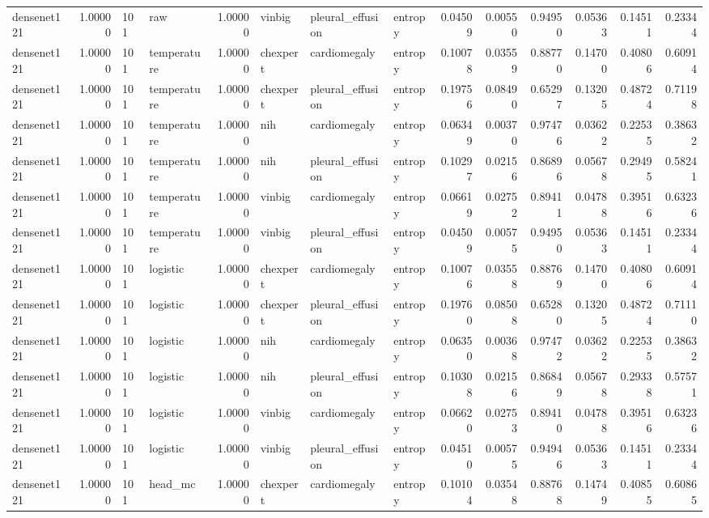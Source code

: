 \begin{tabular}{lrllrlllrrrrrr}
densenet121 & 1.00000 & 101 & raw & 1.00000 & vinbig & pleural\_effusion & entropy & 0.04509 & 0.00550 & 0.94950 & 0.05363 & 0.14511 & 0.23344 \\
densenet121 & 1.00000 & 101 & temperature & 1.00000 & chexpert & cardiomegaly & entropy & 0.10078 & 0.03559 & 0.88770 & 0.14700 & 0.40806 & 0.60914 \\
densenet121 & 1.00000 & 101 & temperature & 1.00000 & chexpert & pleural\_effusion & entropy & 0.19756 & 0.08490 & 0.65297 & 0.13205 & 0.48724 & 0.71198 \\
densenet121 & 1.00000 & 101 & temperature & 1.00000 & nih & cardiomegaly & entropy & 0.06349 & 0.00370 & 0.97476 & 0.03622 & 0.22535 & 0.38632 \\
densenet121 & 1.00000 & 101 & temperature & 1.00000 & nih & pleural\_effusion & entropy & 0.10297 & 0.02156 & 0.86896 & 0.05678 & 0.29495 & 0.58241 \\
densenet121 & 1.00000 & 101 & temperature & 1.00000 & vinbig & cardiomegaly & entropy & 0.06619 & 0.02752 & 0.89411 & 0.04788 & 0.39516 & 0.63236 \\
densenet121 & 1.00000 & 101 & temperature & 1.00000 & vinbig & pleural\_effusion & entropy & 0.04509 & 0.00575 & 0.94950 & 0.05363 & 0.14511 & 0.23344 \\
densenet121 & 1.00000 & 101 & logistic & 1.00000 & chexpert & cardiomegaly & entropy & 0.10076 & 0.03558 & 0.88769 & 0.14700 & 0.40806 & 0.60914 \\
densenet121 & 1.00000 & 101 & logistic & 1.00000 & chexpert & pleural\_effusion & entropy & 0.19760 & 0.08508 & 0.65280 & 0.13205 & 0.48724 & 0.71110 \\
densenet121 & 1.00000 & 101 & logistic & 1.00000 & nih & cardiomegaly & entropy & 0.06350 & 0.00368 & 0.97472 & 0.03622 & 0.22535 & 0.38632 \\
densenet121 & 1.00000 & 101 & logistic & 1.00000 & nih & pleural\_effusion & entropy & 0.10308 & 0.02156 & 0.86849 & 0.05678 & 0.29338 & 0.57571 \\
densenet121 & 1.00000 & 101 & logistic & 1.00000 & vinbig & cardiomegaly & entropy & 0.06620 & 0.02753 & 0.89410 & 0.04788 & 0.39516 & 0.63236 \\
densenet121 & 1.00000 & 101 & logistic & 1.00000 & vinbig & pleural\_effusion & entropy & 0.04510 & 0.00575 & 0.94946 & 0.05363 & 0.14511 & 0.23344 \\
densenet121 & 1.00000 & 101 & head\_mc & 1.00000 & chexpert & cardiomegaly & entropy & 0.10104 & 0.03548 & 0.88768 & 0.14749 & 0.40855 & 0.60865 \\

\end{tabular}
